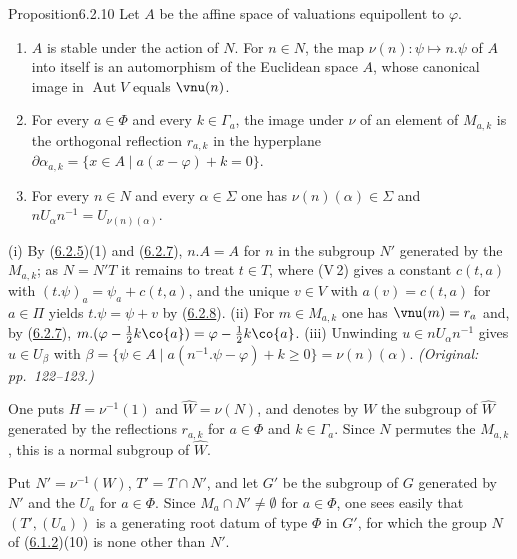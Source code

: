 \documentclass[12pt,a4paper,oneside,english]{smfart}
\makeatletter
\newcommand{\btanchor}[1]{\leavevmode\Hy@raisedlink{\hypertarget{bt:#1}{}}}
\newcommand{\btref}[1]{\hyperlink{bt:#1}{#1}}
\theoremstyle{definition}
\theoremstyle{bt}
\makeatother
\begin{document}
\begin{stmt}{Proposition}{6.2.10}\btanchor{6.2.10}
Let $A$ be the affine space of valuations equipollent to $\varphi$.
\begin{enumerate}
\item[\rm(i)] $A$ is stable under the action of $N$. For $n\in N$, the map
$\nu(n):\psi\mapsto n.\psi$ of $A$ into itself is an automorphism of the Euclidean
space $A$, whose canonical image in $\operatorname{Aut}V$ equals $\vnu(n)$.
\item[\rm(ii)] For every $a\in\Phi$ and every $k\in\Gamma_a$, the image under
$\nu$ of an element of $M_{a,k}$ is the orthogonal reflection $r_{a,k}$ in the
hyperplane $\partial\alpha_{a,k}=\{x\in A\mid a(x-\varphi)+k=0\}$.
\item[\rm(iii)] For every $n\in N$ and every $\alpha\in\Sigma$ one has
$\nu(n)(\alpha)\in\Sigma$ and $nU_\alpha n^{-1}=U_{\nu(n)(\alpha)}$.
\end{enumerate}
\end{stmt}

\begin{sketch}
(i) By (\btref{6.2.5})(1) and (\btref{6.2.7}), $n.A=A$ for $n$ in the subgroup $N'$ generated by
the $M_{a,k}$; as $N=N'T$ it remains to treat $t\in T$, where (V\,2) gives a
constant $c(t,a)$ with $(t.\psi)_a=\psi_a+c(t,a)$, and the unique $v\in V$ with
$a(v)=c(t,a)$ for $a\in\Pi$ yields $t.\psi=\psi+v$ by (\btref{6.2.8}).
(ii) For $m\in M_{a,k}$ one has $\vnu(m)=r_a$ and, by (\btref{6.2.7}),
$m.(\varphi-\frac12k\co{a})=\varphi-\frac12k\co{a}$.
(iii) Unwinding $u\in nU_\alpha n^{-1}$ gives $u\in U_\beta$ with
$\beta=\{\psi\in A\mid a(n^{-1}.\psi-\varphi)+k\ge0\}=\nu(n)(\alpha)$.
\emph{(Original: pp.~122--123.)}
\end{sketch}

\btanchor{6.2.11} One puts $H=\nu^{-1}(1)$ and $\widehat W=\nu(N)$, and denotes by $W$
the subgroup of $\widehat W$ generated by the reflections $r_{a,k}$ for $a\in\Phi$
and $k\in\Gamma_a$. Since $N$ permutes the $M_{a,k}$, this is a normal subgroup of
$\widehat W$.

Put $N'=\nu^{-1}(W)$, $T'=T\cap N'$, and let $G'$ be the subgroup of $G$ generated
by $N'$ and the $U_a$ for $a\in\Phi$. Since $M_a\cap N'\ne\emptyset$ for
$a\in\Phi$, one sees easily that $(T',(U_a))$ is a generating root datum of type
$\Phi$ in $G'$, for which the group $N$ of (\btref{6.1.2})(10) is none other than $N'$.
\end{document}
